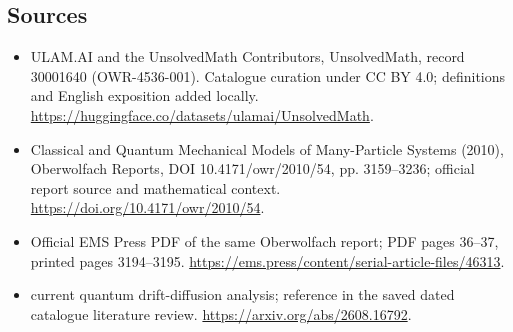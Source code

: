 \documentclass[11pt]{article}
\begin{document}
\subsection{Sources}
\begin{itemize}
\item[\hypertarget{source:30001640:1}{S1}] ULAM.AI and the UnsolvedMath Contributors, UnsolvedMath, record 30001640 (OWR-4536-001). Catalogue curation under CC BY 4.0; definitions and English exposition added locally.
\url{https://huggingface.co/datasets/ulamai/UnsolvedMath}.
\item[\hypertarget{source:30001640:2}{S2}] Classical and Quantum Mechanical Models of Many-Particle Systems (2010), Oberwolfach Reports, DOI 10.4171/owr/2010/54, pp. 3159--3236; official report source and mathematical context.
\url{https://doi.org/10.4171/owr/2010/54}.
\item[\hypertarget{source:30001640:3}{S3}] Official EMS Press PDF of the same Oberwolfach report; PDF pages 36--37, printed pages 3194--3195.
\url{https://ems.press/content/serial-article-files/46313}.
\item[\hypertarget{source:30001640:4}{S4}] current quantum drift-diffusion analysis; reference in the saved dated catalogue literature review.
\url{https://arxiv.org/abs/2608.16792}.
\end{itemize}
\label{end:30001640}
\end{document}
